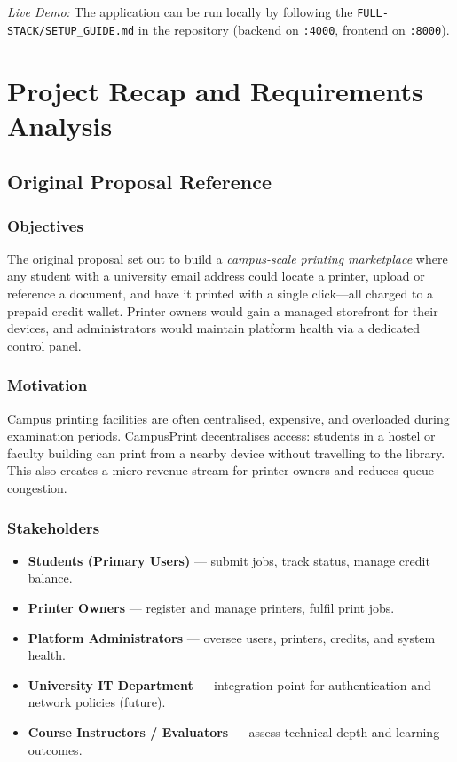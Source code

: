 \documentclass[12pt,a4paper]{report}
\begin{document}
\noindent\textit{Live Demo:} The application can be run locally by following the
\texttt{FULL-STACK/SETUP\_GUIDE.md} in the repository (backend on \texttt{:4000}, frontend on
\texttt{:8000}).

\clearpage

\chapter{Project Recap and Requirements Analysis}

\section{Original Proposal Reference}

\subsection{Objectives}
The original proposal set out to build a \emph{campus-scale printing marketplace} where
any student with a university email address could locate a printer, upload or reference a
document, and have it printed with a single click—all charged to a prepaid credit wallet.
Printer owners would gain a managed storefront for their devices, and administrators would
maintain platform health via a dedicated control panel.

\subsection{Motivation}
Campus printing facilities are often centralised, expensive, and overloaded during
examination periods. CampusPrint decentralises access: students in a hostel or faculty
building can print from a nearby device without travelling to the library. This also creates a
micro-revenue stream for printer owners and reduces queue congestion.

\subsection{Stakeholders}
\begin{itemize}
  \item \textbf{Students (Primary Users)} — submit jobs, track status, manage credit balance.
  \item \textbf{Printer Owners} — register and manage printers, fulfil print jobs.
  \item \textbf{Platform Administrators} — oversee users, printers, credits, and system health.
  \item \textbf{University IT Department} — integration point for authentication and network
    policies (future).
  \item \textbf{Course Instructors / Evaluators} — assess technical depth and learning
    outcomes.
\end{itemize}
\end{document}
